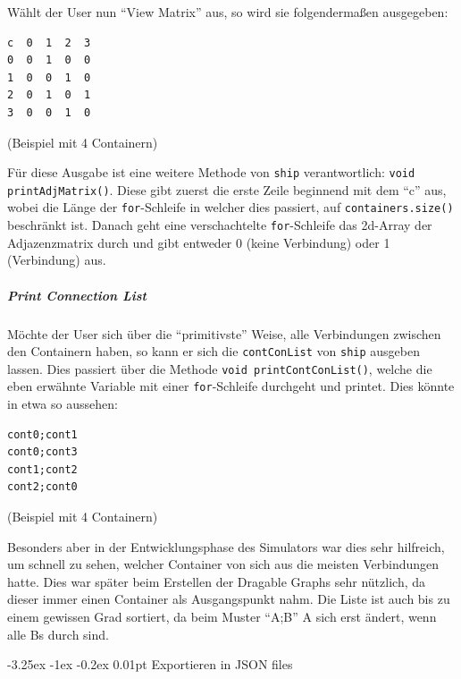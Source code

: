 \documentclass[
    headings=optiontotocandhead,%
    twoside,
    numbers=noenddot,%
    12pt, %
    titlepage, %
    parskip=full, %
    listof=leveldown, 
    numbers=noenddot, %
    a4paper,DIV=14,
    BCOR=15mm,
]{scrbook}
\makeatletter
\newcommand{\passthrough}[1]{#1}
\renewcommand\paragraph{\@startsection{paragraph}{4}{\z@}%
    {-3.25ex \@plus -1ex \@minus -0.2ex}%
    {0.01pt}%
    {\raggedsection\normalfont\sectfont\nobreak\size@paragraph}%
  }
\makeatother
\begin{document}
Wählt der User nun ``View Matrix'' aus, so wird sie folgendermaßen
ausgegeben:

\begin{lstlisting}[caption={Ausgabe der Adjazenzmatrix in der Konsole}]
c  0  1  2  3
0  0  1  0  0 
1  0  0  1  0 
2  0  1  0  1 
3  0  0  1  0 
\end{lstlisting}

(Beispiel mit 4 Containern)

Für diese Ausgabe ist eine weitere Methode von
\passthrough{\lstinline!ship!} verantwortlich:
\passthrough{\lstinline!void printAdjMatrix()!}. Diese gibt zuerst die
erste Zeile beginnend mit dem ``c'' aus, wobei die Länge der
\passthrough{\lstinline!for!}-Schleife in welcher dies passiert, auf
\passthrough{\lstinline!containers.size()!} beschränkt ist. Danach geht
eine verschachtelte \passthrough{\lstinline!for!}-Schleife das 2d-Array
der Adjazenzmatrix durch und gibt entweder 0 (keine Verbindung) oder 1
(Verbindung) aus.

\hypertarget{print-connection-list}{%
\subparagraph{Print Connection List}\label{print-connection-list}}

Möchte der User sich über die ``primitivste'' Weise, alle Verbindungen
zwischen den Containern haben, so kann er sich die
\passthrough{\lstinline!contConList!} von \passthrough{\lstinline!ship!}
ausgeben lassen. Dies passiert über die Methode
\passthrough{\lstinline!void printContConList()!}, welche die eben
erwähnte Variable mit einer \passthrough{\lstinline!for!}-Schleife
durchgeht und printet. Dies könnte in etwa so aussehen:

\begin{lstlisting}[caption={Ausgabe der contConList in der Konsole}]
cont0;cont1
cont0;cont3
cont1;cont2
cont2;cont0
\end{lstlisting}

(Beispiel mit 4 Containern)

Besonders aber in der Entwicklungsphase des Simulators war dies sehr
hilfreich, um schnell zu sehen, welcher Container von sich aus die
meisten Verbindungen hatte. Dies war später beim Erstellen der Dragable
Graphs sehr nützlich, da dieser immer einen Container als Ausgangspunkt
nahm. Die Liste ist auch bis zu einem gewissen Grad sortiert, da beim
Muster ``A;B'' A sich erst ändert, wenn alle Bs durch sind.

\hypertarget{exportieren-in-json-files}{%
\paragraph{Exportieren in JSON files}\label{exportieren-in-json-files}}
\end{document}
